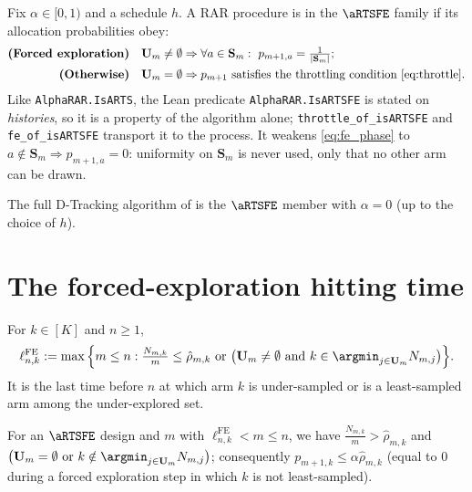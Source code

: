 \begin{definition}\label{def:aRTSFE}
\leanok
{}
Fix $\alpha\in[0,1)$ and a schedule $h$. A RAR procedure is in the $\aRTSFE$
family if its allocation probabilities obey:
\begin{align}
  \textbf{(Forced exploration)}\quad
    &\mathbf{U}_m\ne\emptyset \Rightarrow \forall a\in\mathbf{S}_m:\ p_{m+1,a}=\tfrac{1}{|\mathbf{S}_m|};
    \label{eq:fe_phase}\\
  \textbf{(Otherwise)}\quad
    &\mathbf{U}_m=\emptyset \Rightarrow p_{m+1}\ \text{satisfies the throttling condition \eqref{eq:throttle}.}
    \label{eq:fe_otherwise}
\end{align}
Like \texttt{AlphaRAR.IsARTS}, the Lean predicate \texttt{AlphaRAR.IsARTSFE} is stated on
\emph{histories}, so it is a property of the algorithm alone; \texttt{throttle\_of\_isARTSFE} and
\texttt{fe\_of\_isARTSFE} transport it to the process. It weakens \eqref{eq:fe_phase} to
$a\notin\mathbf{S}_m\Rightarrow p_{m+1,a}=0$: uniformity on $\mathbf{S}_m$ is never used, only that
no other arm can be drawn.
\end{definition}

\begin{remark}\label{rem:d_tracking_fe}
The full D-Tracking algorithm of \cite{garivier2016optimal} is the $\aRTSFE$
member with $\alpha=0$ (up to the choice of $h$).
\end{remark}

\section{The forced-exploration hitting time}
\label{sec:forced_hitting}

\begin{definition}\label{def:hitting_fe}
\leanok
{}
For $k\in[K]$ and $n\ge1$,
\[
  \ell_{n,k}^{\mathrm{FE}} := \max\Big\{ m\le n :
    \tfrac{N_{m,k}}{m}\le\hat{\rho}_{m,k}
    \ \text{or}\ \big(\mathbf{U}_m\ne\emptyset\ \text{and}\ k\in\argmin_{j\in\mathbf{U}_m}N_{m,j}\big)\Big\}.
\]
It is the last time before $n$ at which arm $k$ is under-sampled or is a
least-sampled arm among the under-explored set.
\end{definition}

\begin{lemma}\label{lem:hitting_fe_sign}
\leanok
{}
For an $\aRTSFE$ design and $m$ with $\ell_{n,k}^{\mathrm{FE}} < m \le n$,
we have $\frac{N_{m,k}}{m} > \hat{\rho}_{m,k}$ and
$\big(\mathbf{U}_m=\emptyset\ \text{or}\ k\notin\argmin_{j\in\mathbf{U}_m}N_{m,j}\big)$;
consequently $p_{m+1,k}\le\alpha\hat{\rho}_{m,k}$ (equal to $0$ during a forced
exploration step in which $k$ is not least-sampled).
\end{lemma}

